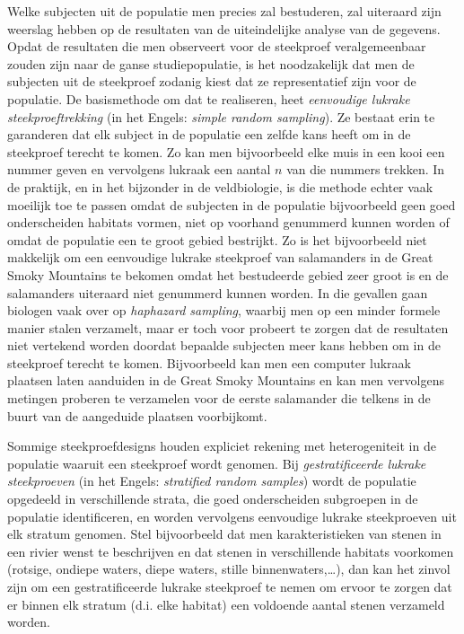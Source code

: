 \documentclass[
  12pt,dutch,coursenotes]{book}
\theoremstyle{definition}
\theoremstyle{definition}
\theoremstyle{definition}
\theoremstyle{definition}
\theoremstyle{remark}
\begin{document}
Welke subjecten uit de populatie men precies zal bestuderen, zal uiteraard zijn weerslag hebben op de resultaten van de uiteindelijke analyse van de gegevens. Opdat de resultaten die men observeert voor de steekproef veralgemeenbaar zouden zijn naar de ganse studiepopulatie, is het noodzakelijk dat men de subjecten uit de steekproef zodanig kiest dat ze representatief zijn voor de populatie. De basismethode om dat te realiseren, heet \emph{eenvoudige lukrake steekproeftrekking} (in het Engels: \emph{simple random sampling}). Ze bestaat erin te garanderen dat elk subject in de populatie een zelfde kans heeft om in de steekproef terecht te komen. Zo kan men bijvoorbeeld elke muis in een kooi een nummer geven en vervolgens lukraak een aantal \(n\) van die nummers trekken. In de praktijk, en in het bijzonder in de veldbiologie, is die methode echter vaak moeilijk toe te passen omdat de subjecten in de populatie bijvoorbeeld geen goed onderscheiden habitats vormen, niet op voorhand genummerd kunnen worden of omdat de populatie een te groot gebied bestrijkt. Zo is het bijvoorbeeld niet makkelijk om een eenvoudige lukrake steekproef van salamanders in de Great Smoky Mountains te bekomen omdat het bestudeerde gebied zeer groot is en de salamanders uiteraard niet genummerd kunnen worden. In die gevallen gaan biologen vaak over op \emph{haphazard sampling}, waarbij men op een minder formele manier stalen verzamelt, maar er toch voor probeert te zorgen dat de resultaten niet vertekend worden doordat bepaalde subjecten meer kans hebben om in de steekproef terecht te komen. Bijvoorbeeld kan men een computer lukraak plaatsen laten aanduiden in de Great Smoky Mountains en kan men vervolgens metingen proberen te verzamelen voor de eerste salamander die telkens in de buurt van de aangeduide plaatsen voorbijkomt.

Sommige steekproefdesigns houden expliciet rekening met heterogeniteit in de populatie waaruit een steekproef wordt genomen. Bij \emph{gestratificeerde lukrake steekproeven} (in het Engels: \emph{stratified random samples}) wordt de populatie opgedeeld in verschillende strata, die goed onderscheiden subgroepen in de populatie identificeren, en worden vervolgens eenvoudige lukrake steekproeven uit elk stratum genomen. Stel bijvoorbeeld dat men karakteristieken van stenen in een rivier wenst te beschrijven en dat stenen in verschillende habitats voorkomen (rotsige, ondiepe waters, diepe waters, stille binnenwaters,\ldots), dan kan het zinvol zijn om een gestratificeerde lukrake steekproef te nemen om ervoor te zorgen dat er binnen elk stratum (d.i. elke habitat) een voldoende aantal stenen verzameld worden.
\end{document}
